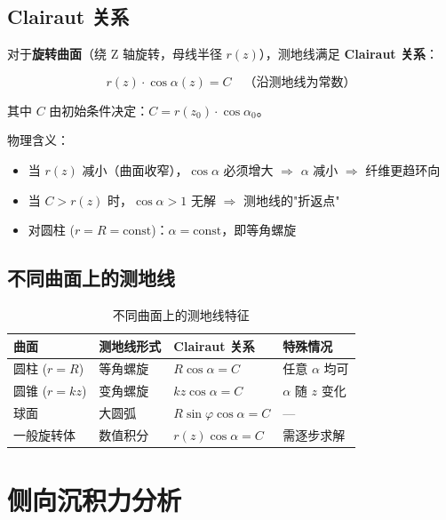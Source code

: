 \documentclass[11pt,a4paper]{article}
\begin{document}
\subsection{Clairaut 关系}

对于\textbf{旋转曲面}（绕 Z 轴旋转，母线半径 $r(z)$），测地线满足 \textbf{Clairaut 关系}：

\begin{equation}
\boxed{r(z) \cdot \cos\alpha(z) = C \quad\text{（沿测地线为常数）}}
\end{equation}

其中 $C$ 由初始条件决定：$C = r(z_0) \cdot \cos\alpha_0$。

物理含义：
\begin{itemize}[nosep]
\item 当 $r(z)$ 减小（曲面收窄），$\cos\alpha$ 必须增大 $\Rightarrow$ $\alpha$ 减小 $\Rightarrow$ 纤维更趋环向
\item 当 $C > r(z)$ 时，$\cos\alpha > 1$ 无解 $\Rightarrow$ 测地线的"折返点"
\item 对圆柱 ($r = R = \text{const}$)：$\alpha = \text{const}$，即等角螺旋
\end{itemize}

\subsection{不同曲面上的测地线}

\begin{table}[H]
\centering
\begin{tabularx}{\textwidth}{l l X l}
\toprule
\textbf{曲面} & \textbf{测地线形式} & \textbf{Clairaut 关系} & \textbf{特殊情况} \\
\midrule
圆柱 ($r=R$) & 等角螺旋 & $R\cos\alpha = C$ & 任意 $\alpha$ 均可 \\
圆锥 ($r=kz$) & 变角螺旋 & $kz\cos\alpha = C$ & $\alpha$ 随 $z$ 变化 \\
球面 & 大圆弧 & $R\sin\varphi\cos\alpha = C$ & — \\
一般旋转体 & 数值积分 & $r(z)\cos\alpha = C$ & 需逐步求解 \\
\bottomrule
\end{tabularx}
\caption{不同曲面上的测地线特征}
\end{table}


\section{侧向沉积力分析}
\end{document}

